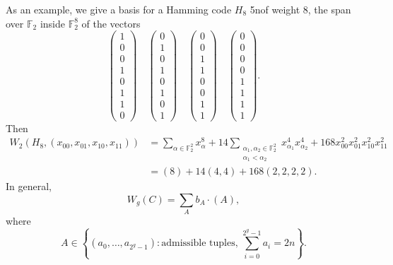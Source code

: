 \documentclass[reqno]{amsart} 
\begin{document}
As an example, we give a basis for a Hamming code $H_8$ 5nof weight $8$, the span over $\mathbb{F}_2$ inside $\mathbb{F}_2^8$ of the vectors
\begin{equation*}
  \begin{pmatrix}
    1 \\ 0 \\ 0 \\ 1 \\ 0 \\ 1 \\ 1 \\ 0
  \end{pmatrix}
  \quad
  \begin{pmatrix}
    0 \\ 1 \\ 0 \\ 1 \\ 0 \\ 1 \\ 0 \\ 1
  \end{pmatrix}
  \quad
  \begin{pmatrix}
    0 \\ 0 \\ 1 \\ 1 \\ 0 \\ 0 \\ 1 \\ 1
  \end{pmatrix}
  \quad
  \begin{pmatrix}
    0 \\ 0 \\ 0 \\ 0 \\ 1 \\ 1 \\ 1 \\ 1
  \end{pmatrix}.
\end{equation*}
Then
\begin{align*}
  W_2(H_8,(x_{00}, x_{01}, x_{10}, x_{11}))
  &= \sum_{\alpha \in \mathbb{F}_2^2}
  x_\alpha^8 + 14
  \sum_{
    \substack{
      \alpha_1, \alpha_2 \in \mathbb{F}_2^2  \\
      \alpha_1 < \alpha_2
    }
  }
  x_{\alpha_1}^4 x_{\alpha_2}^4
  + 168 x_{00}^2 x_{0 1}^2 x_{10}^2 x_{11}^2
  \\
  &=(8) +
    14(4, 4)
    + 168(2, 2, 2, 2).
\end{align*}
In general,
\begin{equation*}
  W_g(C) = \sum_A b_A \cdot(A),
\end{equation*}
where
\begin{equation*}
  A \in \left\{(a_0, \dotsc, a_{2^g - 1}) : \text{admissible tuples},
    \,
    \sum_{i = 0}^{2^g - 1} a_i = 2 n\right\}.
\end{equation*}
\end{document}
